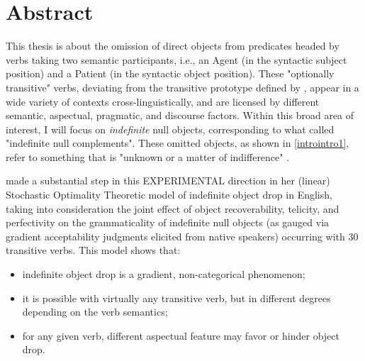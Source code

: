 \chapter*{Abstract}

This thesis is about the omission of direct objects from predicates headed by verbs taking two semantic participants, i.e., an Agent (in the syntactic subject position) and a Patient (in the syntactic object position). These "optionally transitive" verbs, deviating from the transitive prototype defined by \textcite{HopperThompson1980}, appear in a wide variety of contexts cross-linguistically, and are licensed by different semantic, aspectual, pragmatic, and discourse factors. Within this broad area of interest, I will focus on \textit{indefinite} null objects, corresponding to what \textcite{Fillmore1986} called "indefinite null complements". These omitted objects, as shown in \ref{introintro1}, refer to something that is "unknown or a matter of indifference" \parencite[96]{Fillmore1986}.

\textcite{Medina2007} made a substantial step in this EXPERIMENTAL direction in her (linear) Stochastic Optimality Theoretic model of indefinite object drop in English, taking into consideration the joint effect of object recoverability, telicity, and perfectivity on the grammaticality of indefinite null objects (as gauged via gradient acceptability judgments elicited from native speakers) occurring with 30 transitive verbs. This model shows that:
\begin{itemize}
    \item indefinite object drop is a gradient, non-categorical phenomenon;
    \item it is possible with virtually any transitive verb, but in different degrees depending on the verb semantics;
    \item for any given verb, different aspectual feature may favor or hinder object drop.
\end{itemize}

